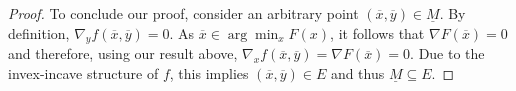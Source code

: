 \documentclass[10pt,a4paper]{amsart}
\begin{document}
\begin{proof}
    To conclude our proof, consider an arbitrary point $(\overline{x},\overline{y})\in \underline{M}$. By definition, $\nabla_y f(\overline{x},\overline{y})=0$. As $\overline{x}\in \arg\min_x F(x)$, it follows that $\nabla F(\overline{x})=0$ and therefore, using our result above, $\nabla_x f(\overline{x},\overline{y})=\nabla F(\overline{x})=0$. Due to the invex-incave structure of $f$, this implies $(\overline{x},\overline{y})\in E$ and thus $\underline{M}\subseteq E$.
\end{proof}
\end{document}
